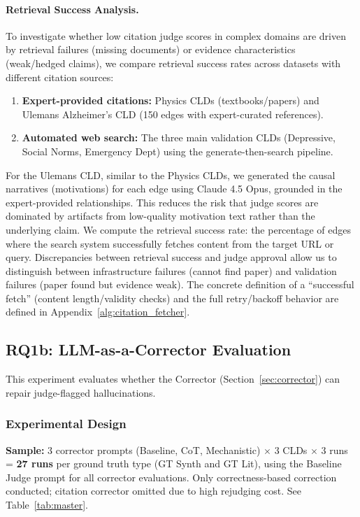 \paragraph{Retrieval Success Analysis.}
To investigate whether low citation judge scores in complex domains are driven by retrieval failures (missing documents) or evidence characteristics (weak/hedged claims), we compare retrieval success rates across datasets with different citation sources:
\begin{enumerate}[noitemsep]
    \item \textbf{Expert-provided citations:} Physics CLDs (textbooks/papers) and Ulemans Alzheimer's CLD (150 edges with expert-curated references).
    \item \textbf{Automated web search:} The three main validation CLDs (Depressive, Social Norms, Emergency Dept) using the generate-then-search pipeline.
\end{enumerate}
For the Ulemans CLD, similar to the Physics CLDs, we generated the causal narratives (motivations) for each edge using Claude 4.5 Opus, grounded in the expert-provided relationships. This reduces the risk that judge scores are dominated by artifacts from low-quality motivation text rather than the underlying claim.
We compute the retrieval success rate: the percentage of edges where the search system successfully fetches content from the target URL or query. Discrepancies between retrieval success and judge approval allow us to distinguish between infrastructure failures (cannot find paper) and validation failures (paper found but evidence weak).
The concrete definition of a “successful fetch” (content length/validity checks) and the full retry/backoff behavior are defined in Appendix~\ref{alg:citation_fetcher}.

\subsection{RQ1b: LLM-as-a-Corrector Evaluation}

This experiment evaluates whether the Corrector (Section~\ref{sec:corrector}) can repair judge-flagged hallucinations.

\subsubsection{Experimental Design}
\textbf{Sample:} 3 corrector prompts (Baseline, CoT, Mechanistic) $\times$ 3 CLDs $\times$ 3 runs = \textbf{27 runs} per ground truth type (GT Synth and GT Lit), using the Baseline Judge prompt for all corrector evaluations. Only correctness-based correction conducted; citation corrector omitted due to high rejudging cost. See Table~\ref{tab:master}.

